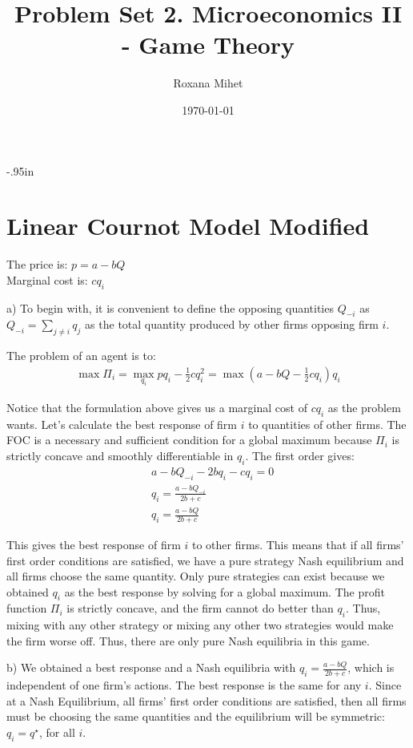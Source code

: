 \documentclass[letter,11pt]{article}
\begin{document}
 
\oddsidemargin 0.2in \topmargin -.95in 
\title{Problem Set 2. Microeconomics II - Game Theory} 
\date{\today}
\author{Roxana Mihet}
\maketitle

\section{Linear Cournot Model Modified}
\hfill

The price is: $p=a-bQ$\\
Marginal cost is: $c q_i$

a) To begin with, it is convenient to define the opposing quantities $Q_{-i}$ as $Q_{-i} = \sum_{j \neq i} q_j$ as the total quantity produced by other firms opposing firm $i$. 

The problem of an agent is to:
\begin{align}
\max \Pi_i = \max_{q_i} p q_i - \frac{1}{2} c q_i^2 = \max (a-bQ - \frac{1}{2} c q_i) q_i
\end{align}

Notice that the formulation above gives us a marginal cost of $c q_i$ as the problem wants. Let's calculate the best response of firm $i$ to quantities of other firms. The FOC is a necessary and sufficient condition for a global maximum because $\Pi_i $ is strictly concave and smoothly differentiable in $q_i$. The first order gives:
\begin{align}
& a-bQ_{-i} - 2b q_i - c q_i = 0 \\
& q_i = \frac{a-bQ_{-i} }{2b + c}  \\
& \boxed{q_i = \frac{a-bQ}{2b + c}}
\end{align}

This gives the best response of firm $i$ to other firms. This means that if all firms' first order conditions are satisfied, we have a pure strategy Nash equilibrium and all firms choose the same quantity. Only pure strategies can exist because we obtained $q_i$ as the best response by solving for a global maximum. The profit function $\Pi_i$ is strictly concave, and the firm cannot do better than $q_i$. Thus, mixing with any other strategy or mixing any other two strategies would make the firm worse off. Thus, there are only pure Nash equilibria in this game.

b) We obtained a best response and a Nash equilibria with $ q_i = \frac{a-bQ}{2b + c}$, which is independent of one firm's actions. The best response is the same for any $i$. Since at a Nash Equilibrium, all firms' first order conditions are satisfied, then all firms must be choosing the same quantities and the equilibrium will be symmetric: $q_i = q^{\star}$, for all $i$. 
\end{document}
